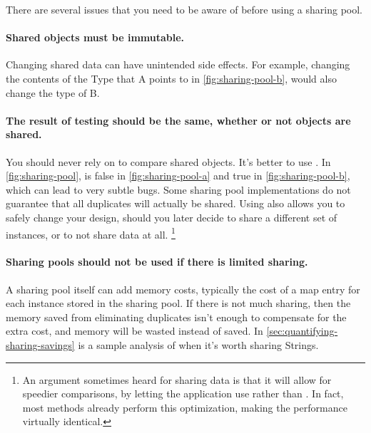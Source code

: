 There are several issues that you need to be aware of before using a sharing
pool.
\paragraph{Shared objects must be immutable.} Changing shared data can
have unintended side effects. For example, 
changing the contents of the Type that A points to in
\autoref{fig:sharing-pool-b}, would also change the type of B.

\paragraph{The result of  testing should be the same,
whether or not objects are shared.}
You should never rely on \code{==} to compare shared objects. It's better to use
. In \autoref{fig:sharing-pool},  is
false in \autoref{fig:sharing-pool-a} and true in \autoref{fig:sharing-pool-b}, which can lead to very subtle bugs.
Some sharing pool implementations do not guarantee that all
duplicates will actually be shared. Using  also allows
you to safely change your design, should you later decide to share a different set of instances, or to not share data at all.
\footnote{An argument sometimes heard for sharing data is that it will
allow for speedier comparisons, by letting the application use \code{==} rather
than . In fact, most
  methods already perform this optimization, making the performance virtually identical.}
 
\paragraph{Sharing pools should not be used if there is limited sharing.}
A sharing pool itself can add
memory costs, typically the cost of a map entry for each instance stored in the
sharing pool.
If there is not much sharing, then the memory saved from
eliminating duplicates isn't enough to compensate for the
extra cost, and memory will be wasted instead of saved.  In \autoref{sec:quantifying-sharing-savings} is
a sample analysis of when it's worth sharing Strings.


